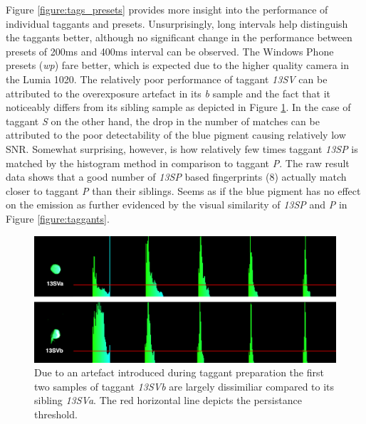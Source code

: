 \documentclass[thesis.tex]{subfiles}
\begin{document}
Figure \ref{figure:tags_presets} provides more insight into the performance of individual taggants and presets. Unsurprisingly, long intervals help distinguish the taggants better, although no significant change in the performance between presets of 200ms and 400ms interval can be observed. The Windows Phone presets (\emph{wp}) fare better, which is expected due to the higher quality camera in the Lumia 1020. The relatively poor performance of taggant \emph{13SV} can be attributed to the overexposure artefact in its \emph{b} sample and the fact that it noticeably differs from its sibling sample as depicted in Figure \ref{figure:13SV}. In the case of taggant \emph{S} on the other hand, the drop in the number of matches can be attributed to the poor detectability of the blue pigment causing relatively low SNR. Somewhat surprising, however, is how relatively few times taggant \emph{13SP} is matched by the histogram method in comparison to taggant \emph{P}. The raw result data shows that a good number of \emph{13SP} based fingerprints (8) actually match closer to taggant \emph{P} than their siblings. Seems as if the blue pigment has no effect on the emission as further evidenced by the visual similarity of \emph{13SP} and \emph{P} in Figure \ref{figure:taggants}.

\begin{figure}[h!]
  \centering \includegraphics[page=1,width=\textwidth]{images/findings/13SV}
  \caption{Due to an artefact introduced during taggant preparation the first two samples of taggant \emph{13SVb} are largely dissimiliar compared to its sibling \emph{13SVa}. The red horizontal line depicts the persistance threshold.}
  \label{figure:13SV}
\end{figure}
\end{document}

